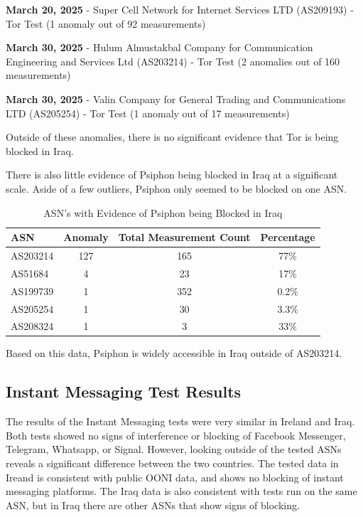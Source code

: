 \textbf{March 20, 2025} - Super Cell Network for Internet Services LTD (AS209193) - Tor Test (1 anomaly out of 92 measurements)

\textbf{March 30, 2025} - Hulum Almustakbal Company for Communication Engineering and Services Ltd (AS203214) - Tor Test (2 anomalies out of 160 measurements)

\textbf{March 30, 2025} - Valin Company for General Trading and Communications LTD (AS205254) - Tor Test (1 anomaly out of 17 measurements)

Outside of these anomalies, there is no significant evidence that Tor is being blocked in Iraq.

There is also little evidence of Psiphon being blocked in Iraq at a significant scale. Aside of a few outliers, Psiphon only seemed to be blocked on one ASN. 

\begin{table}[H]
\centering
\caption{ASN's with Evidence of Psiphon being Blocked in Iraq}
\begin{tabular}{lccc}
\toprule
\textbf{ASN} & \textbf{Anomaly} & \textbf{Total Measurement Count} & \textbf{Percentage} \\
\midrule
AS203214  & 127 & 165  & 77\% \\
AS51684   & 4   & 23   & 17\% \\
AS199739  & 1   & 352  & 0.2\% \\
AS205254  & 1   & 30   & 3.3\% \\
AS208324  & 1   & 3    & 33\% \\
\bottomrule
\end{tabular}
\label{tab:category_block}
\end{table}

Based on this data, Psiphon is widely accessible in Iraq outside of AS203214.

\subsection{Instant Messaging Test Results}

The results of the Instant Messaging tests were very similar in Ireland and Iraq. Both tests showed no signs of interference or blocking of Facebook Messenger, Telegram, Whatsapp, or Signal. However, looking outside of the tested ASNs reveals a significant difference between the two countries. The tested data in Ireand is consistent with public OONI data, and shows no blocking of instant messaging platforms. The Iraq data is also consistent with tests run on the same ASN, but in Iraq there are other ASNs that show signs of blocking.

